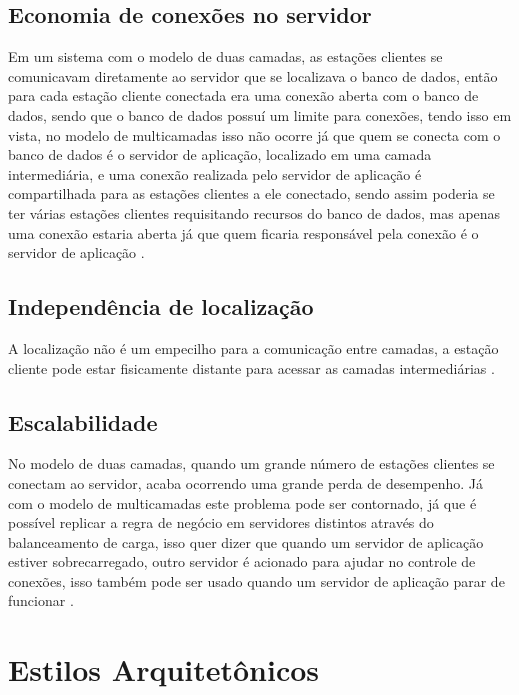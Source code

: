 \subsection{Economia de conexões no servidor}

Em um sistema com o modelo de duas camadas, as estações clientes se comunicavam diretamente ao servidor que se localizava o banco de dados, então para cada estação cliente conectada era uma conexão aberta com o banco de dados, sendo que o banco de dados possuí um limite para conexões, tendo isso em vista, no modelo de multicamadas isso não ocorre já que quem se conecta com o banco de dados é o servidor de aplicação, localizado em uma camada intermediária, e uma conexão realizada pelo servidor de aplicação é compartilhada para as estações clientes a ele conectado, sendo assim poderia se ter várias estações clientes requisitando recursos do banco de dados, mas apenas uma conexão estaria aberta já que quem ficaria responsável pela conexão é o servidor de aplicação \cite{devmediaMultiCamada2018}.

\subsection{Independência de localização}

A localização não é um empecilho para a comunicação entre camadas, a estação cliente pode estar fisicamente distante para acessar as camadas intermediárias  \cite{devmediaMultiCamada2018}.

\subsection{Escalabilidade}

No modelo de duas camadas, quando um grande número de estações clientes se conectam ao servidor, acaba ocorrendo uma grande perda de desempenho. Já com o modelo de multicamadas este problema pode ser contornado, já que é possível replicar a regra de negócio em servidores distintos através do balanceamento de carga, isso quer dizer que quando um servidor de aplicação estiver sobrecarregado, outro servidor é acionado para ajudar no controle de conexões, isso também pode ser usado quando um servidor de aplicação parar de funcionar \cite{devmediaMultiCamada2018}.

\section{Estilos Arquitetônicos}

